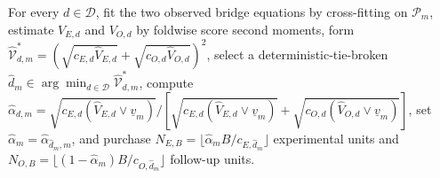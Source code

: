 For every \(d\in\mathcal D\), fit the two observed bridge equations by cross-fitting on \(\mathcal P_m\), estimate \(V_{E,d}\) and \(V_{O,d}\) by foldwise score second moments, form \(\widehat{\mathcal V}_{d,m}^*=(\sqrt{c_{E,d}\widehat V_{E,d}}+\sqrt{c_{O,d}\widehat V_{O,d}})^2\), select a deterministic-tie-broken \(\widehat d_m\in\arg\min_{d\in\mathcal D}\widehat{\mathcal V}_{d,m}^*\), compute \(\widehat\alpha_{d,m}=\sqrt{c_{E,d}(\widehat V_{E,d}\vee\underline v_m)}/[\sqrt{c_{E,d}(\widehat V_{E,d}\vee\underline v_m)}+\sqrt{c_{O,d}(\widehat V_{O,d}\vee\underline v_m)}]\), set \(\widehat\alpha_m=\widehat\alpha_{\widehat d_m,m}\), and purchase \(N_{E,B}=\lfloor\widehat\alpha_mB/c_{E,\widehat d_m}\rfloor\) experimental units and \(N_{O,B}=\lfloor(1-\widehat\alpha_m)B/c_{O,\widehat d_m}\rfloor\) follow-up units.